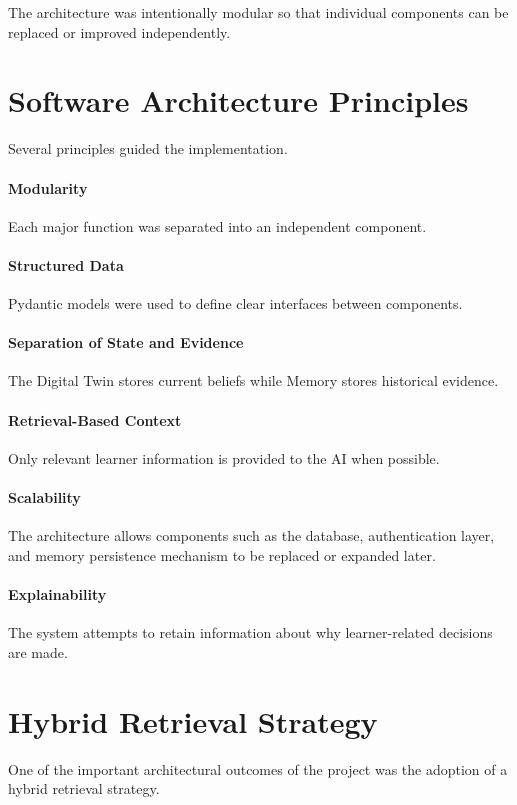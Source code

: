 \documentclass[12pt,a4paper]{article}
\begin{document}
The architecture was intentionally modular so that individual components can be replaced or improved independently.

\section{Software Architecture Principles}
Several principles guided the implementation.

\paragraph{Modularity} Each major function was separated into an independent component.

\paragraph{Structured Data} Pydantic models were used to define clear interfaces between components.

\paragraph{Separation of State and Evidence} The Digital Twin stores current beliefs while Memory stores historical evidence.

\paragraph{Retrieval-Based Context} Only relevant learner information is provided to the AI when possible.

\paragraph{Scalability} The architecture allows components such as the database, authentication layer, and memory persistence mechanism to be replaced or expanded later.

\paragraph{Explainability} The system attempts to retain information about why learner-related decisions are made.

\section{Hybrid Retrieval Strategy}
One of the important architectural outcomes of the project was the adoption of a hybrid retrieval strategy.
\end{document}
